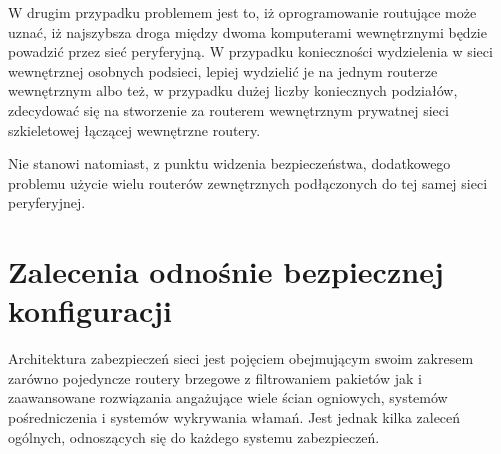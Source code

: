 W drugim przypadku problemem jest to, iż oprogramowanie routujące może
uznać, iż najszybsza droga między dwoma komputerami wewnętrznymi będzie
powadzić przez sieć peryferyjną. W przypadku konieczności wydzielenia w
sieci wewnętrznej osobnych podsieci, lepiej wydzielić je na jednym routerze
wewnętrznym albo też, w przypadku dużej liczby koniecznych podziałów,
zdecydować się na stworzenie za routerem wewnętrznym prywatnej sieci
szkieletowej łączącej wewnętrzne routery.

Nie stanowi natomiast, z punktu widzenia bezpieczeństwa, dodatkowego
problemu użycie wielu routerów zewnętrznych podłączonych do tej samej sieci
peryferyjnej.


\section{Zalecenia odnośnie bezpiecznej konfiguracji}

Architektura zabezpieczeń sieci jest pojęciem obejmującym swoim zakresem
zarówno pojedyncze routery brzegowe z filtrowaniem pakietów jak i
zaawansowane rozwiązania angażujące wiele ścian ogniowych, systemów
pośredniczenia i systemów wykrywania włamań. Jest jednak kilka zaleceń
ogólnych, odnoszących się do każdego systemu zabezpieczeń.


